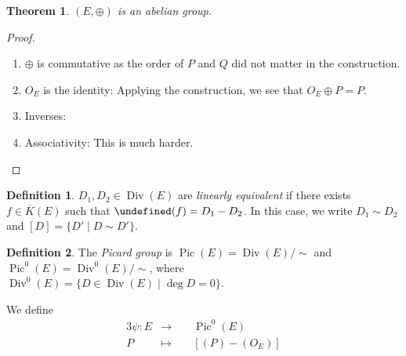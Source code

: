 \documentclass[11pt]{article}
\theoremstyle{definition}
\newtheorem*{definition*}{Definition}
\theoremstyle{plain}
\newtheorem{theorem}[definition]{Theorem}
\theoremstyle{remark}
\renewcommand{\qedsymbol}{$\blacksquare$}
\let\div\undefined
\DeclareMathOperator{\div}{div}
\DeclareMathOperator{\Div}{Div}
\DeclareMathOperator{\Pic}{Pic}
\begin{document}
\begin{theorem}\label{thm:4_1}
    $(E, \oplus)$ is an abelian group.
\end{theorem}
\begin{proof}\phantom{}
    \begin{enumerate}
        \item $\oplus$ is commutative as the order of $P$ and $Q$ did not matter in the construction.

        \item $O_E$ is the identity: Applying the construction, we see that $O_E \oplus P = P$.
            \begin{figure}[H]
            \centering
            \end{figure}

        \item Inverses: %

        \item Associativity: This is much harder.
    \end{enumerate}
    \renewcommand{\qedsymbol}{}
\end{proof}

\begin{definition*}
    $D_1, D_2 \in \Div(E)$ are \emph{linearly equivalent} if there exists $f \in \overline{K}(E)$ such that $\div(f) = D_1 - D_2$. In this case, we write $D_1 \sim D_2$ and $[D] = \{D' \mid D \sim D'\}$.
\end{definition*}

\begin{definition*}
    The \emph{Picard group} is $\Pic(E) = \Div(E)/\sim$ and $\Pic^0(E) = \Div^0(E)/\sim$, where $\Div^0(E) = \{D \in \Div(E) \mid \deg D = 0\}$.
\end{definition*}

We define
\begin{alignat*}{3}
    \psi : E &\longrightarrow\,\,&& \Pic^0(E)\\
    P &\longmapsto&& [(P) - (O_E)]
\end{alignat*}
\end{document}
